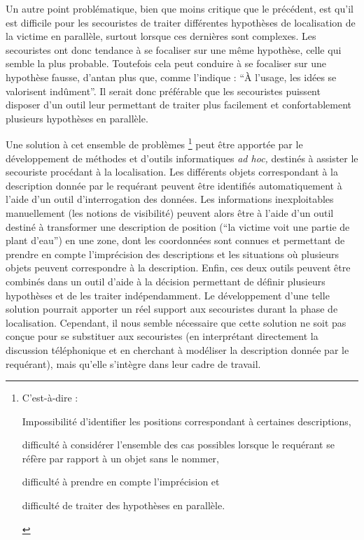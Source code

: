 Un autre point problématique, bien que moins critique que le
précédent, est qu'il est difficile pour les secouristes de traiter
différentes hypothèses de localisation de la victime en parallèle,
surtout lorsque ces dernières sont complexes. Les secouristes ont donc
tendance à se focaliser sur une même hypothèse, celle qui semble la
plus probable. Toutefois cela peut conduire à se focaliser sur une
hypothèse fausse, d’antan plus que, comme l'indique
\textcite{Bachelard1934} : \enquote{À l'usage, les idées se valorisent
  indûment}. Il serait donc préférable que les secouristes puissent
disposer d'un outil leur permettant de traiter plus facilement et
confortablement plusieurs hypothèses en parallèle.

Une solution à cet ensemble de problèmes \footnote{C'est-à-dire :%
  \begin{enumerate*}[label=(\arabic*)]
  \item Impossibilité d'identifier les positions correspondant à
    certaines descriptions,
  \item difficulté à considérer l'ensemble des cas possibles lorsque
    le requérant se réfère par rapport à un objet sans le nommer,
  \item difficulté à prendre en compte l'imprécision et
  \item difficulté de traiter des hypothèses en parallèle.
  \end{enumerate*}} peut être apportée par le développement de
méthodes et d'outils informatiques \emph{ad hoc,} destinés à assister
le secouriste procédant à la localisation. Les différents objets
correspondant à la description donnée par le requérant peuvent être
identifiés automatiquement à l'aide d'un outil d’interrogation des
données. Les informations inexploitables manuellement (\eg les notions
de visibilité) peuvent alors être à l'aide d'un outil destiné à
transformer une description de position (\eg \enquote{la victime voit
  une partie de plant d'eau}) en une zone, dont les coordonnées sont
connues et permettant de prendre en compte l'imprécision des
descriptions et les situations où plusieurs objets peuvent
correspondre à la description. Enfin, ces deux outils peuvent être
combinés dans un outil d'aide à la décision permettant de définir
plusieurs hypothèses et de les traiter indépendamment. Le
développement d'une telle solution pourrait apporter un réel support
aux secouristes durant la phase de localisation. Cependant, il nous
semble nécessaire que cette solution ne soit pas conçue pour se
substituer aux secouristes (\eg en interprétant directement la
discussion téléphonique et en cherchant à modéliser la description
donnée par le requérant), mais qu'elle s'intègre dans leur cadre de
travail.

